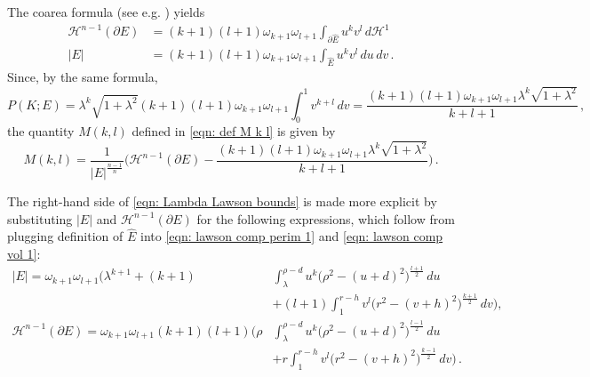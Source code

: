 \documentclass[10pt,reqno]{amsart}
\numberwithin{equation}{section}
\theoremstyle{definition}
\newcommand{\Hcal}{\mathcal{H}}
\DeclareMathOperator{\Lawson}{Lawson}
\begin{document}
{{The coarea formula (see e.g. \cite{Davini04}) yields
\begin{align}
\label{eqn: lawson comp perim 1}    \Hcal^{n-1}(\partial E) &= (k+1)(l+1) \omega_{k+1}\omega_{l+1}\int_{\partial \hat E} u^k v^l \, d\Hcal^1 \\
\label{eqn: lawson comp vol 1}    |E| &= (k+1)(l+1) \omega_{k+1}\omega_{l+1} \int_{\hat E} u^k v^l \, du\, dv\,.
\end{align}
Since, by the same formula,
\[
    P(K; E) = \lambda^k \sqrt{1+\lambda^2} (k+1)(l+1) \omega_{k+1}\omega_{l+1} \int_0^1 v^{k+l}\, dv = \frac{(k+1)(l+1) \omega_{k+1}\omega_{l+1}\lambda^k \sqrt{1+\lambda^2} }{k+l+1}\,,
\]
the quantity $M(k,l)$ defined in \eqref{eqn: def M k l} is given by
\begin{equation}\label{eqn: Lambda Lawson bounds}
    M(k,l) = \frac{1}{|E|^{\frac{n-1}{n}}} \bigg(\Hcal^{n-1}(\partial E)-\frac{(k+1)(l+1) \omega_{k+1}\omega_{l+1}\lambda^k \sqrt{1+\lambda^2} }{k+l+1} \bigg)\,.
\end{equation}

The right-hand side of \eqref{eqn: Lambda Lawson bounds} is made more explicit   by substituting $|E|$ and  $\Hcal^{n-1}(\partial E)$ for the following expressions, which follow from plugging definition of $\hat{E}$ into \eqref{eqn: lawson comp perim 1} and \eqref{eqn: lawson comp vol 1}:
\begin{align}
 \nonumber   |E|  = \omega_{k+1} \omega_{l+1} \Big( \lambda^{k+1} + (k+1) &\int_\lambda^{\rho -d} u^k \big(\rho^2 - (u+d)^2 \big)^{\frac{l+1}{2}} \,du\\
    &
\label{eqn: Lawson comp Flint vol}
+ (l+1)  \int_1^{r-h} v^l \big(r^2 - (v+h)^2\big)^{\frac{k+1}{2}} \,dv   \Big),\\
\nonumber    \mathcal{H}^{n-1}(\partial E)  = \omega_{k+1} \omega_{l+1} (k+1)(l+1)\Big( \rho & \int_{\lambda}^{\rho-d} u^k \big(\rho^2 -(u+d)^2 \big)^{\frac{l-1}{2}} \,du\\
\label{eqn: Lawson comp Flint perim}   
& + r  \int_{1}^{r-h} v^l \big(r^2 -(v+h)^2\big)^{\frac{k-1}{2}} \,dv  \Big)\,.
\end{align}

}}
\end{document}
